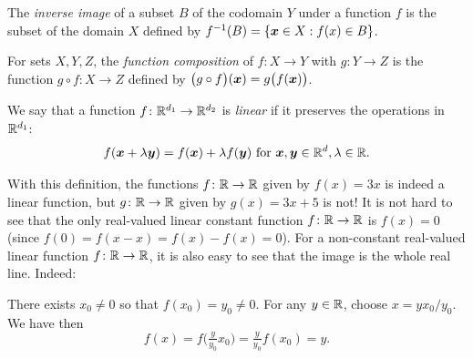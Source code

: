 The \emph{inverse image} of a subset $B$ of the codomain $Y$ under a function $f$ is the subset of the domain $X$ defined by $f^{-1}(B) = \{ \boldsymbol{x} \in X : f(x) \in B\}$.

For sets $X, Y, Z$, the \emph{function composition} of $f\colon X \to Y$ with $g\colon Y \to Z$ is the function $g\circ f\colon X \to Z$ defined by $\big( g \circ f \big)(\boldsymbol{x}) = g \big( f(\boldsymbol{x}) \big)$.

\begin{example}\label{example:linearFunction}
We say that a function $f \colon \mathbb{R}^{d_1} \to \mathbb{R}^{d_2}$ is \emph{linear} if it preserves the operations in $\mathbb{R}^{d_1}$: 
\begin{equation*}
f(\boldsymbol{x} + \lambda \boldsymbol{y}) = f(\boldsymbol{x}) + \lambda f(\boldsymbol{y}) \text{ for }\boldsymbol{x}, \boldsymbol{y} \in \mathbb{R}^d, \lambda \in \mathbb{R}.
\end{equation*}

With this definition, the functions $f\colon \mathbb{R} \to \mathbb{R}$ given by $f(x) = 3x$ is indeed a linear function, but $g\colon \mathbb{R} \to \mathbb{R}$ given by $g(x)=3x+5$ is not!  
It is not hard to see that the only real-valued linear constant function $f\colon \mathbb{R} \to \mathbb{R}$ is $f(x) = 0$ (since $f(0)=f(x-x)=f(x)-f(x)=0$).  For a non-constant real-valued linear function $f\colon \mathbb{R} \to \mathbb{R}$, it is also easy to see that the image is the whole real line.  Indeed:

There exists $x_0\neq 0$ so that $f(x_0)=y_0\neq 0$. For any $y \in \mathbb{R}$, choose $x = y x_0/y_0$.  We have then
\begin{equation*}
f(x) = f\big( \tfrac{y}{y_0} x_0 \big) = \tfrac{y}{y_0} f(x_0) = y.
\end{equation*}
\end{example}

